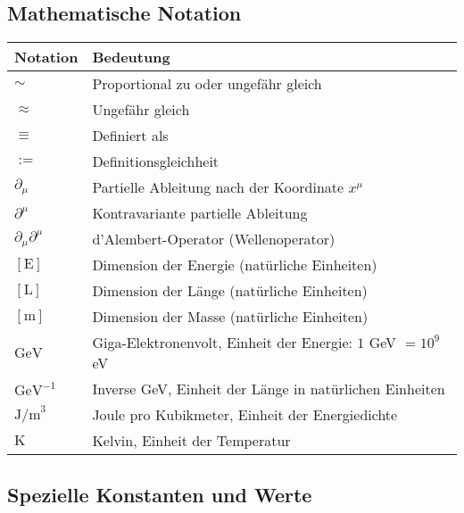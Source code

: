 \documentclass[12pt,a4paper]{article}
\numberwithin{equation}{section}
\begin{document}
	\subsection*{Mathematische Notation}
	
	\begin{longtable}{p{2cm} p{12cm}}
		\toprule
		\textbf{Notation} & \textbf{Bedeutung} \\
		\midrule
		\endhead
		
		$\sim$ & Proportional zu oder ungefähr gleich \\
		$\approx$ & Ungefähr gleich \\
		$\equiv$ & Definiert als \\
		$:=$ & Definitionsgleichheit \\
		$\partial_\mu$ & Partielle Ableitung nach der Koordinate $x^\mu$ \\
		$\partial^\mu$ & Kontravariante partielle Ableitung \\
		$\partial_\mu \partial^\mu$ & d'Alembert-Operator (Wellenoperator) \\
		$[\text{E}]$ & Dimension der Energie (natürliche Einheiten) \\
		$[\text{L}]$ & Dimension der Länge (natürliche Einheiten) \\
		$[\text{m}]$ & Dimension der Masse (natürliche Einheiten) \\
		$\text{GeV}$ & Giga-Elektronenvolt, Einheit der Energie: $1$ GeV $= 10^9$ eV \\
		$\text{GeV}^{-1}$ & Inverse GeV, Einheit der Länge in natürlichen Einheiten \\
		$\text{J/m}^3$ & Joule pro Kubikmeter, Einheit der Energiedichte \\
		$\text{K}$ & Kelvin, Einheit der Temperatur \\
		\bottomrule
	\end{longtable}
	
	\subsection*{Spezielle Konstanten und Werte}
	
\end{document}
